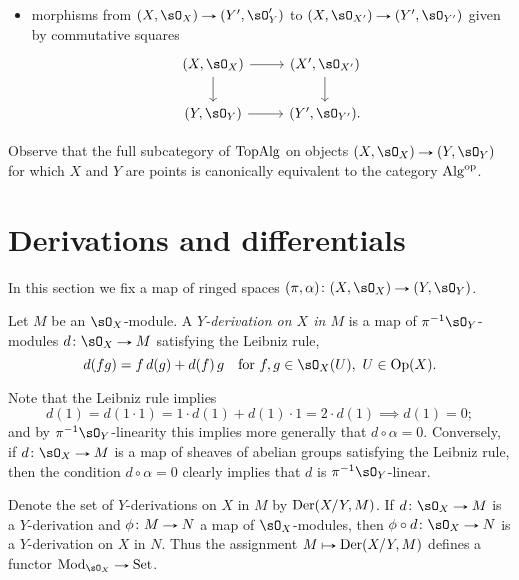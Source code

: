 \begin{definitions}
\begin{enumerate}[leftmargin=*]
\begin{itemize}
    \item morphisms from $(X,\sO_X) \to (Y',\sO_Y')$ to $(X,\sO_{X'}) \to (Y',\sO_{Y'})$ given by commutative squares
      \[
      \begin{tikzcd}
        (X,\sO_X) \ar[r] \ar[d] & (X',\sO_{X'}) \ar[d] \\
        (Y,\sO_Y) \ar[r] & (Y',\sO_{Y'}).
      \end{tikzcd}
      \]
    \end{itemize}
    Observe that the full subcategory of $\mathrm{Top}\mathrm{Alg}$ on objects $(X,\sO_X) \to (Y,\sO_Y)$ for which $X$ and $Y$ are points is canonically equivalent to the category $\mathrm{Alg}^{\mathrm{op}}$.
  \end{enumerate}
\end{definitions}


\section{Derivations and differentials}

In this section we fix a map of ringed spaces $(\pi,\alpha) \c (X,\sO_X) \to (Y,\sO_Y)$.

\begin{definition}
  \label{derivation}
  Let $M$ be an $\sO_X$-module. A \emph{$Y$-derivation on $X$ in $M$} is
  a map of $\pi^{-1}\sO_Y$-modules $d \c \sO_X \to M$ satisfying the Leibniz rule,
  \[
    d(fg) = f\,d(g) + d(f)\,g \quad
    \text{for}\ f,g \in \sO_X(U),\ U \in \Op(X).
  \]
\end{definition}

\begin{remark}
  \label{derivation-kills-constants}
  Note that the Leibniz rule implies
  \[
    d(1) = d(1 \cdot 1) = 1 \cdot d(1) + d(1) \cdot 1 = 2 \cdot d(1)
    \implies d(1) = 0;
  \]
  and by $\pi^{-1}\sO_Y$-linearity this implies more generally that
  $d \circ \alpha = 0$. Conversely, if $d \c \sO_X \to M$ is a map of
  sheaves of abelian groups satisfying the Leibniz rule, then the
  condition $d \circ \alpha = 0$ clearly implies that $d$ is
  $\pi^{-1}\sO_Y$-linear.
\end{remark}

\begin{notation}
  \label{derivation-functor}
  Denote the set of $Y$-derivations on $X$ in $M$ by $\mathrm{Der}(X/Y,M)$. If $d \c \sO_X \to M$ is a $Y$-derivation and $\phi \c M \to N$ a map of $\sO_X$-modules, then $\phi \circ d \c \sO_X \to N$ is a $Y$-derivation on $X$ in $N$. Thus the assignment $M \mapsto \Der(X/Y,M)$ defines a functor $\Mod_{\sO_X} \to \Set$.
\end{notation}

